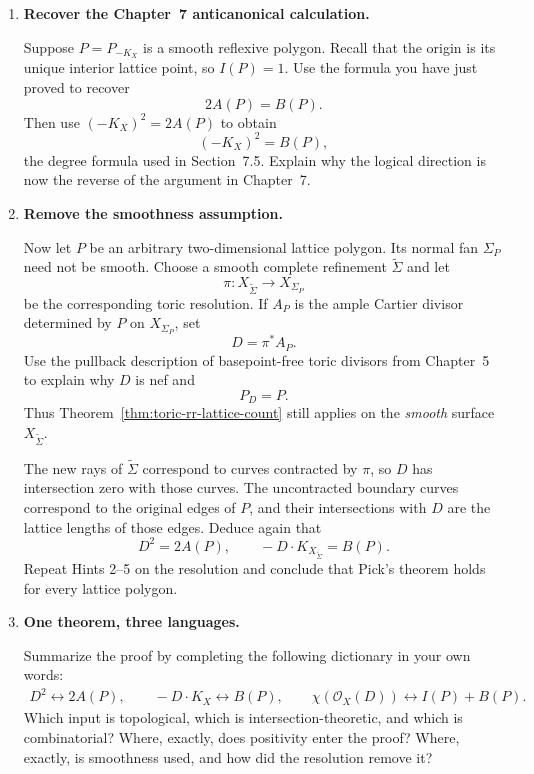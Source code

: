\begin{enumerate}[label=\textbf{Hint \arabic*.},wide=0pt]
Since every lattice point of \(P\) is either interior or on the
boundary,
\[
L_P(1)=I(P)+B(P).
\]
Substitute \(k=1\) into the Riemann--Roch polynomial and show
\[
I(P)+B(P)
=
A(P)+\frac12B(P)+1.
\]
Rearrange.  You have proved
\[
\boxed{
A(P)=I(P)+\frac12B(P)-1,
}
\]
Pick's theorem for smooth lattice polygons.

\item \textbf{Recover the Chapter~7 anticanonical calculation.}

Suppose \(P=P_{-K_X}\) is a smooth reflexive polygon.  Recall that
the origin is its unique interior lattice point, so \(I(P)=1\).
Use the formula you have just proved to recover
\[
2A(P)=B(P).
\]
Then use \((-K_X)^2=2A(P)\) to obtain
\[
\boxed{
(-K_X)^2=B(P),
}
\]
the degree formula used in Section~7.5.  Explain why the logical
direction is now the reverse of the argument in Chapter~7.

\item \textbf{Remove the smoothness assumption.}

Now let \(P\) be an arbitrary two-dimensional lattice polygon.  Its
normal fan \(\Sigma_P\) need not be smooth.  Choose a smooth complete
refinement \(\widetilde\Sigma\) and let
\[
\pi:X_{\widetilde\Sigma}\longrightarrow X_{\Sigma_P}
\]
be the corresponding toric resolution.  If \(A_P\) is the ample
Cartier divisor determined by \(P\) on \(X_{\Sigma_P}\), set
\[
D=\pi^*A_P.
\]
Use the pullback description of basepoint-free toric divisors from
Chapter~5 to explain why \(D\) is nef and
\[
P_D=P.
\]
Thus Theorem~\ref{thm:toric-rr-lattice-count} still applies on the
\emph{smooth} surface \(X_{\widetilde\Sigma}\).

The new rays of \(\widetilde\Sigma\) correspond to curves contracted
by \(\pi\), so \(D\) has intersection zero with those curves.  The
uncontracted boundary curves correspond to the original edges of
\(P\), and their intersections with \(D\) are the lattice lengths of
those edges.  Deduce again that
\[
D^2=2A(P),
\qquad
-D\cdot K_{X_{\widetilde\Sigma}}=B(P).
\]
Repeat Hints 2--5 on the resolution and conclude that Pick's theorem
holds for every lattice polygon.

\item \textbf{One theorem, three languages.}

Summarize the proof by completing the following dictionary in your
own words:
\[
\boxed{
\begin{gathered}
D^2
\longleftrightarrow
2A(P),
\qquad
-D\cdot K_X
\longleftrightarrow
B(P),
\qquad
\chi(\mathcal O_X(D))
\longleftrightarrow
I(P)+B(P).
\end{gathered}}
\]
Which input is topological, which is intersection-theoretic, and
which is combinatorial?  Where, exactly, does positivity enter the
proof?  Where, exactly, is smoothness used, and how did the resolution
remove it?

\end{enumerate}

